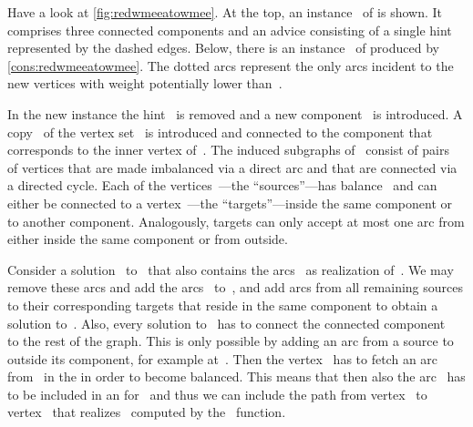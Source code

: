 \begin{example}\label{ex:redwmeeatowmee}
  Have a look at \autoref{fig:redwmeeatowmee}. At the top, an instance~ of \pWMEECLAs{} is shown. It comprises three connected components and an advice consisting of a single hint~ represented by the dashed edges. Below, there is an instance~ of \pWMEEs{} produced by \autoref{cons:redwmeeatowmee}. The dotted arcs represent the only arcs incident to the new vertices with weight potentially lower than~. 

In the new instance the hint~ is removed and a new component~ is introduced. A copy~ of the vertex set~ is introduced and connected to the component that corresponds to the inner vertex of~. The induced subgraphs of~ consist of pairs~ of vertices that are made imbalanced via a direct arc and that are connected via a directed cycle. Each of the vertices~---the ``sources''---has balance~ and can either be connected to a vertex~---the ``targets''---inside the same component or to another component. Analogously, targets can only accept at most one arc from either inside the same component or from outside. 

Consider a solution~ to~ that also contains the arcs~ as realization of~. We may remove these arcs and add the arcs~ to~, and add arcs from all remaining sources to their corresponding targets that reside in the same component to obtain a solution to~. Also, every solution to~ has to connect the connected component~ to the rest of the graph. This is only possible by adding an arc from a source to outside its component, for example at~. Then the vertex~ has to fetch an arc from~ in the \EE{} in order to become balanced. This means that then also the arc~ has to be included in an \EE{} for~ and thus we can include the path from vertex~ to vertex~ that realizes~ computed by the~ function.
\end{example}
